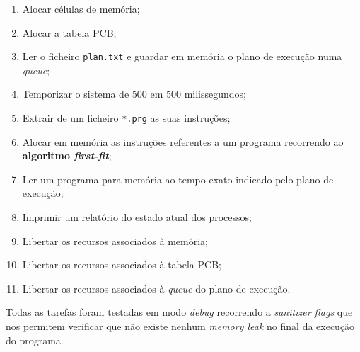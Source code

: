 \documentclass[a4paper,11pt,onecolumn,oneside]{article}
\begin{document}
	\begin{enumerate}
		\item Alocar células de memória;
		\item Alocar a tabela PCB;
		\item Ler o ficheiro \texttt{plan.txt} e guardar em memória o plano de execução numa \textit{queue};
		\item Temporizar o sistema de 500 em 500 milissegundos;
		\item Extrair de um ficheiro \texttt{*.prg} as suas instruções;
		\item Alocar em memória as instruções referentes a um programa recorrendo ao \textbf{algoritmo \textit{first-fit}};
		\item Ler um programa para memória ao tempo exato indicado pelo plano de execução;
		
		
		\item Imprimir um relatório do estado atual dos processos;
		\item Libertar os recursos associados à memória;
		\item Libertar os recursos associados à tabela PCB;
		\item Libertar os recursos associados à \textit{queue} do plano de execução.
	\end{enumerate}
	
	Todas as tarefas foram testadas em modo \textit{debug} recorrendo a \textit{sanitizer flags} que nos permitem verificar que não existe nenhum \textit{memory leak} no final da execução do programa.
	
	
	
\end{document}
